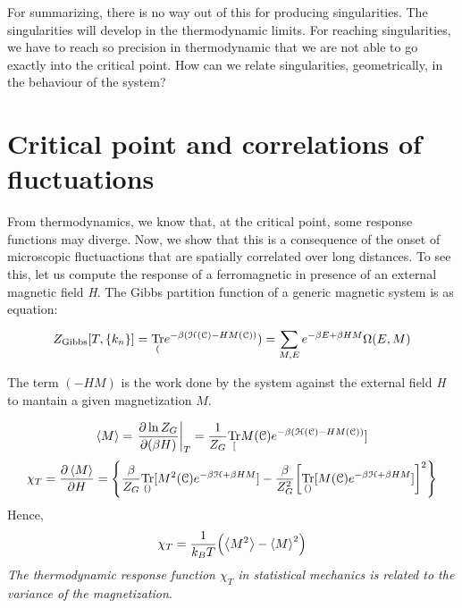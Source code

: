 \documentclass[../../Main/Main.tex]{subfiles}
\begin{document}
For summarizing, there is no way out of this for producing singularities. The singularities will develop in the thermodynamic limits. For reaching singularities, we have to reach so precision in thermodynamic that we are not able to go exactly into the critical point. How can we relate singularities, geometrically, in the behaviour of the system?

 \section{Critical point and correlations of fluctuations}
 From thermodynamics, we know that, at the critical point, some response functions may diverge. Now, we show that this is a consequence of the onset of microscopic fluctuactions that are spatially correlated over long distances.
 To see this, let us compute the response of a ferromagnetic in presence of an external magnetic field \emph{H}.
 The Gibbs partition function of a generic magnetic system is as equation:
 \begin{equation*}
   Z_{\text{Gibbs}} [T,\{ k_n \}  ] = \underset{(}{\text{Tr}}e^{-\beta (\mathcal{H} (\mathcal{C}) - H M (\mathcal{C}))} ) = \sum_{M,E}^{} e^{-\beta E + \beta H M} \Omega (E,M)
 \end{equation*}
\begin{remark}
The term \( (- H M) \) is the work done by the system against the external field \emph{H} to mantain a given magnetization \( M \).
\end{remark}
\begin{equation}
  \expval{M} = \eval{ \pdv{\ln{Z_G} }{(\beta H)} }_T = \frac{1}{Z_G} \Tr[M (\mathcal{C}) e^{-\beta ( \mathcal{H} (\mathcal{C}) - H M (\mathcal{C}))} ]
\end{equation}
\begin{equation}
  \chi _T = \pdv{\expval{M} }{H} = \qty{\frac{\beta }{Z_G} \underset{\qty}{\text{Tr}}[M^2 (\mathcal{C}) e^{-\beta \mathcal{H} + \beta H M} ] - \frac{\beta }{Z_G^2} \qty[ \underset{\qty}{\text{Tr}}[M (\mathcal{C}) e^{-\beta \mathcal{H} + \beta H M } ]  ]^2 }
\end{equation}
Hence,
\begin{equation}
  \chi _T = \frac{1}{k_B T} \qty(\expval{M^2} - \expval{M}^2  )
\end{equation}
\emph{The thermodynamic response function \( \chi _T \) in statistical mechanics is related to the variance of the magnetization}.
\end{document}
